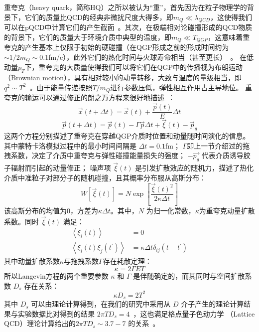 	重夸克（heavy quark，简称HQ）之所以被认为“重”，首先因为在粒子物理学的背景下，它们的质量比QCD的经典非微扰尺度大得多，即$m_Q \ll \lambda_{QCD}$，这使得我们可以在pQCD中计算它们的产生截面~\parencite{Cacciari:2005rk}。其次，在极端相对论碰撞形成的QCD物质的背景下，它们的质量大于环境介质中典型的温度，即$m_Q \ll T_{QGP}$，这意味着重夸克的产生基本上仅限于初始的硬碰撞（在QGP形成之前的形成时间约为$\sim 1/2m_Q \sim 0.1 $fm/c），此外它们的热化时间与火球寿命相当（甚至更长）~\parencite{Svetitsky:1987gq}。
	在低动量$p_T$下，重夸克的大质量使得我们可以将它们在QGP中的传播视为布朗运动（Brownian motion），具有相对较小的动量转移，大致与温度的量级相当，即$q^2 ∼ T^2$~\parencite{Dong:2019byy,Rapp:2009my}。由于能量传递按照$T/m_Q$进行参数压低，弹性相互作用占主导地位。
	重夸克的输运可以通过修正的朗之万方程来很好地描述~\parencite{Moore:2004tg,Cao:2013ita,Zhou:2016vwq,Dai:2018mhw,Wang:2019xey,Wang:2020ukj}：
  \begin{equation}
    	  	\vec{x}(t+\Delta t)=\vec{x}(t)+\frac{\vec{p}(t)}{E} \Delta t
    	  	\label{eq:Lange1}
   \end{equation}
  \begin{equation}
	  \vec{p}(t+\Delta t)=\vec{p}(t)-\Gamma \vec{p} \Delta t+\vec{\xi}(t)-\vec{p}_g
	  \label{eq:Lange2}
\end{equation}
	这两个方程分别描述了重夸克在穿越QGP介质时位置和动量随时间演化的信息。
  其中蒙特卡洛模拟过程中的最小时间间隔是 $\Delta t = 0.1 $fm；
  $\Gamma$即上一节介绍过的拖拽系数，决定了介质中重夸克与弹性碰撞能量损失的强度；
  $- \vec{p_g}$ 代表介质诱导胶子辐射而引起的动量修正；
  噪声项 $\vec{\xi}(t)$ 是引发扩散效应的随机力，描述了热化介质中准粒子对部分子的随机碰撞，且其概率分布服从高斯分布：
  \begin{equation}
  	W[\vec{\xi}(t)]=N \exp \left[\frac{\vec{\xi}(t)^2}{2 \kappa \Delta t}\right]
	\label{eq:Gau}
  \end{equation}
  该高斯分布的均值为0，方差为$\kappa \Delta t$。其中，$N$ 为归一化常数，$\kappa$为重夸克动量扩散系数。同时 $\vec{\xi}(t)$ 满足：
  \begin{equation}
  	\begin{aligned}
  		\left\langle\xi_i(t)\right\rangle & =0 \\
  		\left\langle\xi_i(t) \xi_j\left(t^{\prime}\right)\right\rangle & =\kappa \Delta t \delta_{i j}\left(t-t^{\prime}\right)
  	\end{aligned}
	\label{eq:xi}
  \end{equation}
  其中动量扩散系数$\kappa$与拖拽系数$\Gamma$存在耗散定理：
  \begin{equation}
    \kappa = 2\Gamma ET
  	\label{eq:kappa}
  \end{equation}
  所以Langevin方程的两个重要参数 $\kappa$ 和 $\Gamma$ 是伴随确定的，而其同时与空间扩散系数 $D_s$ 存在关系：
  \begin{equation}
	\kappa D_s = 2T^2
	\label{eq:Ds}
 \end{equation}
  其中 $D_s$ 可以由理论计算得到，在我们的研究中采用从 $D$ 介子产生的理论计算结果与实验数据比对得到的结果 $2\pi TD_s = 4$~\parencite{Rapp:2018qla}，这也满足格点量子色动力学 （Lattice QCD）理论计算给出的$2\pi TD_s \sim 3.7 - 7$ 的关系~\parencite{Banerjee:2011ra,Francis:2015daa,}。
  

